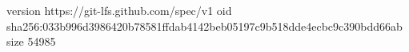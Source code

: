 version https://git-lfs.github.com/spec/v1
oid sha256:033b996d3986420b78581ffdab4142beb05197c9b518dde4ecbc9c390bdd66ab
size 54985
